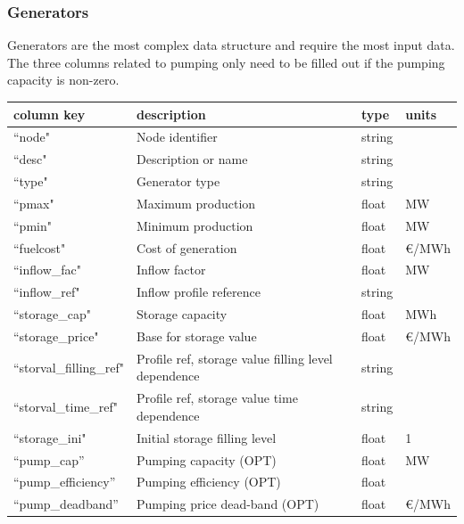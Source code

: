 \documentclass{article}
\begin{document}
\subsubsection{Generators}
Generators are the most complex data structure and require the most input data.
The three columns related to pumping only need to be filled out if the pumping capacity is non-zero.

\medskip
\begin{tabular}{llll}
	\hline
	 column key & description & type & units \\
	\hline
	``node"			& Node identifier 		& string	& \\
	``desc"			& Description or name	& string	& \\
	``type"			& Generator type		& string	& \\
	``pmax"			& Maximum production 	& float	& MW \\
	``pmin"			& Minimum production	& float	& MW \\
	``fuelcost"		& Cost of generation		& float	& €/MWh \\
	``inflow\_fac"	& Inflow factor			& float	& MW \\
	``inflow\_ref"		& Inflow profile reference	& string & \\
	``storage\_cap"	& Storage capacity		& float	& MWh \\
	``storage\_price"			& Base for storage value	& float	& €/MWh \\
	``storval\_filling\_ref"	& Profile ref, storage value filling level dependence 	& string & \\
	``storval\_time\_ref"	& Profile ref, storage value time dependence 	& string & \\
	``storage\_ini"		& Initial storage filling level	& float	& 1 \\
	``pump\_cap''		& Pumping capacity (OPT)	& float		& MW \\
	``pump\_efficiency''	& Pumping efficiency (OPT) & float	& \\
	``pump\_deadband''	& Pumping price dead-band (OPT)  & float & €/MWh \\
	\hline
\end{tabular}
\end{document}
